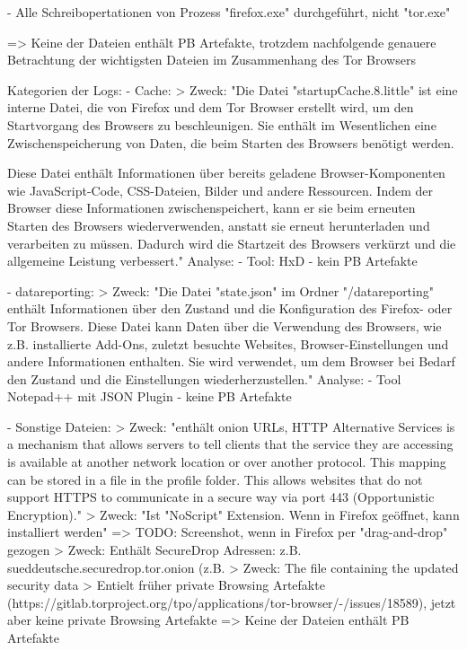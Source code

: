 - Alle Schreibopertationen von Prozess "firefox.exe" durchgeführt, nicht "tor.exe" 

=> Keine der Dateien enthält PB Artefakte, trotzdem nachfolgende genauere Betrachtung der wichtigsten Dateien im Zusammenhang des Tor Browsers

Kategorien der Logs:
- Cache: 
	> %
	Zweck:
		"Die Datei "startupCache.8.little" ist eine interne Datei, die von Firefox und dem Tor Browser erstellt wird, um den Startvorgang des Browsers zu beschleunigen. Sie enthält im Wesentlichen eine Zwischenspeicherung von Daten, die beim Starten des Browsers benötigt werden.

		Diese Datei enthält Informationen über bereits geladene Browser-Komponenten wie JavaScript-Code, CSS-Dateien, Bilder und andere Ressourcen. Indem der Browser diese Informationen zwischenspeichert, kann er sie beim erneuten Starten des Browsers wiederverwenden, anstatt sie erneut herunterladen und verarbeiten zu müssen. Dadurch wird die Startzeit des Browsers verkürzt und die allgemeine Leistung verbessert." %
	Analyse:
		- Tool: HxD
		- kein PB Artefakte

- datareporting:
	> %
	Zweck: 
		"Die Datei "state.json" im Ordner "/datareporting" enthält Informationen über den Zustand und die Konfiguration des Firefox- oder Tor Browsers. Diese Datei kann Daten über die Verwendung des Browsers, wie z.B. installierte Add-Ons, zuletzt besuchte Websites, Browser-Einstellungen und andere Informationen enthalten. Sie wird verwendet, um dem Browser bei Bedarf den Zustand und die Einstellungen wiederherzustellen."
	Analyse:
		- Tool Notepad++ mit JSON Plugin
		- keine PB Artefakte

- Sonstige Dateien:
	> %
		Zweck:
			"enthält onion URLs,
			HTTP Alternative Services is a mechanism that allows servers to tell clients that the service they are accessing is available at another network location or over another protocol.
			This mapping can be stored in a file in the profile folder. This allows websites that do not support HTTPS to communicate in a secure way via port 443 (Opportunistic Encryption)."
	> %
		Zweck:
			"Ist "NoScript" Extension. Wenn in Firefox geöffnet, kann installiert werden"
		=> TODO: Screenshot, wenn in Firefox per "drag-and-drop" gezogen
	> %
		Zweck:
			Enthält SecureDrop Adressen: z.B. sueddeutsche.securedrop.tor.onion (z.B. %
	> %
		Zweck: The file containing the updated security data %
	> %
		Entielt früher private Browsing Artefakte (https://gitlab.torproject.org/tpo/applications/tor-browser/-/issues/18589), jetzt aber keine private Browsing Artefakte
	=> Keine der Dateien enthält PB Artefakte
				

